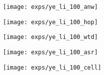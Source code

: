 \documentclass{USC-Thesis}
\numberwithin{equation}{chapter}
\begin{document}
\begin{figure*}[tbh]
	\begin{minipage}[b]{0.195\linewidth}
	\centering
		\texttt{[image: exps/ye\_li\_100\_anw]}
		\label{fig:ye_li_100_anw}
	\end{minipage}
	\begin{minipage}[b]{0.195\linewidth}
	\centering
		\texttt{[image: exps/ye\_li\_100\_hop]}
		\label{fig:ye_li_100_hop}
	\end{minipage}
	\begin{minipage}[b]{0.195\linewidth}
	\centering
		\texttt{[image: exps/ye\_li\_100\_wtd]}
		\label{fig:ye_li_100_atd}
	\end{minipage}	
	\begin{minipage}[b]{0.195\linewidth}
		\centering
		\texttt{[image: exps/ye\_li\_100\_asr]}
		\label{fig:ye_li_100_asr}
	\end{minipage}
		\begin{minipage}[b]{0.195\linewidth}
		\centering
		\texttt{[image: exps/ye\_li\_100\_cell]}
		\label{fig:ye_li_100_cell}
	\end{minipage}
	

\end{figure*}
\end{document}
